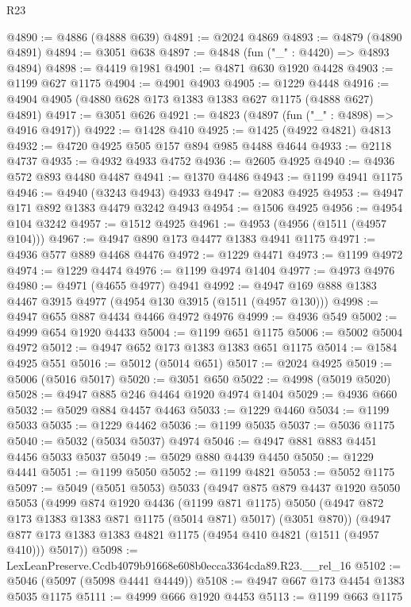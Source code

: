 \begin{lexlean}{R23}
\begin{coremodule}
@4890 := @4886 (@4888 @639)
@4891 := @2024 @4869
@4893 := @4879 (@4890 @4891)
@4894 := @3051 @638
@4897 := @4848 (fun ("_" : @4420) => @4893 @4894)
@4898 := @4419 @1981
@4901 := @4871 @630 @1920 @4428
@4903 := @1199 @627 @1175
@4904 := @4901 @4903
@4905 := @1229 @4448
@4916 := @4904 @4905 (@4880 @628 @173 @1383 @1383 @627 @1175 (@4888 @627) @4891)
@4917 := @3051 @626
@4921 := @4823 (@4897 (fun ("_" : @4898) => @4916 @4917))
@4922 := @1428 @410
@4925 := @1425 (@4922 @4821) @4813
@4932 := @4720 @4925 @505 @157 @894 @985 @4488 @4644
@4933 := @2118 @4737
@4935 := @4932 @4933 @4752
@4936 := @2605 @4925
@4940 := @4936 @572 @893 @4480 @4487
@4941 := @1370 @4486
@4943 := @1199 @4941 @1175
@4946 := @4940 (@3243 @4943) @4933
@4947 := @2083 @4925
@4953 := @4947 @171 @892 @1383 @4479 @3242 @4943
@4954 := @1506 @4925
@4956 := @4954 @104 @3242
@4957 := @1512 @4925
@4961 := @4953 (@4956 (@1511 (@4957 @104)))
@4967 := @4947 @890 @173 @4477 @1383 @4941 @1175
@4971 := @4936 @577 @889 @4468 @4476
@4972 := @1229 @4471
@4973 := @1199 @4972
@4974 := @1229 @4474
@4976 := @1199 @4974 @1404
@4977 := @4973 @4976
@4980 := @4971 (@4655 @4977) @4941
@4992 := @4947 @169 @888 @1383 @4467 @3915 @4977 (@4954 @130 @3915 (@1511 (@4957 @130)))
@4998 := @4947 @655 @887 @4434 @4466 @4972 @4976
@4999 := @4936 @549
@5002 := @4999 @654 @1920 @4433
@5004 := @1199 @651 @1175
@5006 := @5002 @5004 @4972
@5012 := @4947 @652 @173 @1383 @1383 @651 @1175
@5014 := @1584 @4925 @551
@5016 := @5012 (@5014 @651)
@5017 := @2024 @4925
@5019 := @5006 (@5016 @5017)
@5020 := @3051 @650
@5022 := @4998 (@5019 @5020)
@5028 := @4947 @885 @246 @4464 @1920 @4974 @1404
@5029 := @4936 @660
@5032 := @5029 @884 @4457 @4463
@5033 := @1229 @4460
@5034 := @1199 @5033
@5035 := @1229 @4462
@5036 := @1199 @5035
@5037 := @5036 @1175
@5040 := @5032 (@5034 @5037) @4974
@5046 := @4947 @881 @883 @4451 @4456 @5033 @5037
@5049 := @5029 @880 @4439 @4450
@5050 := @1229 @4441
@5051 := @1199 @5050
@5052 := @1199 @4821
@5053 := @5052 @1175
@5097 := @5049
    (@5051 @5053)
    @5033
    (@4947
      @875
      @879
      @4437
      @1920
      @5050
      @5053
      (@4999
        @874
        @1920
        @4436
        (@1199 @871 @1175)
        @5050
        (@4947 @872 @173 @1383 @1383 @871 @1175 (@5014 @871) @5017)
        (@3051 @870))
      (@4947 @877 @173 @1383 @1383 @4821 @1175 (@4954 @410 @4821 (@1511 (@4957 @410))) @5017))
@5098 := LexLeanPreserve.Ccdb4079b91668e608b0ecca3364cda89.R23.__rel_16
@5102 := @5046 (@5097 (@5098 @4441 @4449))
@5108 := @4947 @667 @173 @4454 @1383 @5035 @1175
@5111 := @4999 @666 @1920 @4453
@5113 := @1199 @663 @1175

\end{coremodule}
\end{lexlean}

